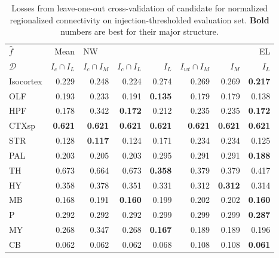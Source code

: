 \begin{table}[H]
\begin{tabular}{lrrrrrrr}
\toprule
$\widehat f$ &           Mean & \multicolumn{5}{l}{NW} &     EL \\
$\mathcal D$ & $I_c \cap I_L$ & $I_c \cap I_M$ & $I_c \cap I_L$ &  $I_L$ & $I_{wt} \cap I_M$ &  $I_M$ &  $I_L$ \\
\midrule
Isocortex &          0.229 &          0.248 &          0.224 &  0.274 &             0.269 &  0.269 &  \textbf{0.217} \\
OLF       &          0.193 &          0.233 &          0.191 &   \textbf{0.135} &             0.179 &  0.179 &  0.138 \\
HPF       &          0.178 &          0.342 &          \textbf{ 0.172 }&  0.212 &             0.235 &  0.235 &   \textbf{0.172} \\
CTXsp     &          \textbf{ 0.621 }&      \textbf{     0.621 }&       \textbf{    0.621} &   \textbf{0.621 }&            \textbf{  0.621} &   \textbf{0.621 }&   \textbf{0.621 }\\
STR       &          0.128 &         \textbf{  0.117} &          0.124 &  0.171 &             0.234 &  0.234 &  0.125 \\
PAL       &          0.203 &          0.205 &          0.203 &  0.295 &             0.291 &  0.291 & \textbf{  0.188 }\\
TH        &          0.673 &          0.664 &          0.673 &   \textbf{0.358} &             0.379 &  0.379 &  0.417 \\
HY        &          0.358 &          0.378 &          0.351 &  0.331 &             0.312 &   \textbf{0.312} &  0.314 \\
MB        &          0.168 &          0.191 &         \textbf{ 0.160 }&  0.199 &             0.202 &  0.202 & \textbf{ 0.160} \\
P         &          0.292 &          0.292 &          0.292 &  0.299 &             0.299 &  0.299 &\textbf{  0.287 }\\
MY        &          0.268 &          0.347 &          0.268 &  \textbf{0.167} &             0.189 &  0.189 &  0.196 \\
CB        &          0.062 &          0.062 &          0.062 &  0.068 &             0.108 &  0.108 &  \textbf{0.061 }\\
\bottomrule
\end{tabular}
\caption{Losses from leave-one-out cross-validation of candidate for normalized regionalized connectivity on injection-thresholded evaluation set. \textbf{Bold} numbers are best for their major structure.}
\label{tab:crossvalidation}
\end{table}

